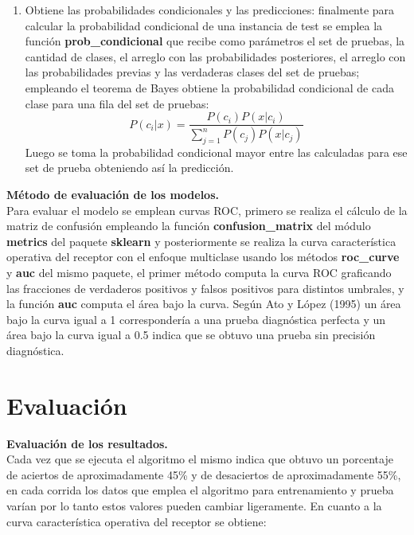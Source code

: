 \begin{enumerate}
	\item Obtiene las probabilidades condicionales y las predicciones:
	finalmente para calcular la probabilidad condicional de una instancia de test se emplea la función
	\textbf{prob\_condicional} que recibe como parámetros el set de pruebas, la cantidad de clases, el
	arreglo con las probabilidades posteriores, el arreglo con las probabilidades previas y las verdaderas
	clases del set de pruebas; empleando el teorema de Bayes obtiene la probabilidad condicional de cada
	clase para una fila del set de pruebas:
	\[P\left(c_{i}|x\right)=
	\frac{P\left(c_{i}\right)P\left(x|c_{i}\right)}{\sum_{j=1}^{n}P\left(c_{j}\right)P\left(x|c_{j}\right)}
	\]
	Luego se toma la probabilidad condicional mayor entre las calculadas para ese set de prueba
	obteniendo así la predicción.
\end{enumerate}

\noindent
\textbf{Método de evaluación de los modelos.}\\

Para evaluar el modelo se emplean curvas ROC, primero se realiza el cálculo de la matriz de confusión empleando la función
\textbf{confusion\_matrix} del módulo \textbf{metrics} del paquete \textbf{sklearn}
y posteriormente se realiza la curva característica operativa del receptor con el enfoque multiclase usando los métodos
\textbf{roc\_curve} y \textbf{auc} del mismo paquete, el primer método computa la curva ROC graficando las fracciones de
verdaderos positivos y falsos positivos para distintos umbrales, y la función \textbf{auc} computa el área bajo la curva.
Según Ato y López (1995) un área bajo la curva igual a 1 correspondería a una prueba diagnóstica perfecta y un
área bajo la curva igual a 0.5 indica que se obtuvo una prueba sin precisión diagnóstica.

\section{Evaluación}

\noindent
\textbf{Evaluación de los resultados.}\\

Cada vez que se ejecuta el algoritmo el mismo indica que obtuvo un porcentaje de aciertos de aproximadamente
45\% y de desaciertos de aproximadamente 55\%, en cada corrida los datos que emplea el algoritmo para entrenamiento
y prueba varían por lo tanto estos valores pueden cambiar ligeramente. En cuanto a la curva característica
operativa del receptor se obtiene:


